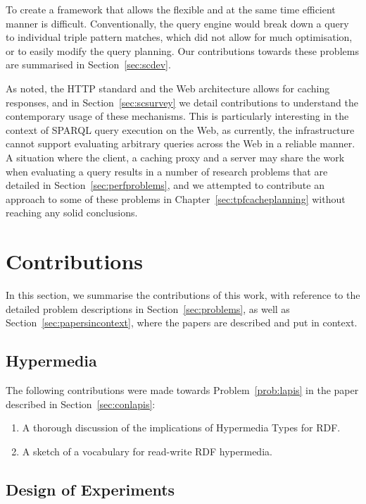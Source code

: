 To create a framework that allows the flexible and at the same time
efficient manner is difficult. Conventionally, the query engine would
break down a query to individual triple pattern matches, which did not
allow for much optimisation, or to easily modify the query
planning. Our contributions towards these problems are summarised in
Section~\ref{sec:scdev}.

As noted, the HTTP standard and the Web architecture allows for
caching responses, and in Section~\ref{sec:scsurvey} we detail
contributions to understand the contemporary usage of these
mechanisms. This is particularly interesting in the context of SPARQL
query execution on the Web, as currently, the infrastructure cannot
support evaluating arbitrary queries across the Web in a reliable
manner. A situation where the client, a caching proxy and a server may
share the work when evaluating a query results in a number of research
problems that are detailed in Section~\ref{sec:perfproblems}, and we
attempted to contribute an approach to some of these problems in
Chapter~\ref{sec:tpfcacheplanning} without reaching any solid
conclusions.



\section{Contributions}\label{sec:contribsum}

In this section, we summarise the contributions of this work, with
reference to the detailed problem descriptions in
Section~\ref{sec:problems}, as well as
Section~\ref{sec:papersincontext}, where the papers are described and
put in context. 

\subsection{Hypermedia}\label{sec:schm}

The following contributions were made towards Problem~\ref{prob:lapis}
in the paper described in Section~\ref{sec:conlapis}:

\begin{enumerate}
\item A thorough discussion of the implications of Hypermedia
  Types\cite{hypermediatypes} for RDF.
\item A sketch of a vocabulary for read-write RDF hypermedia.
\end{enumerate}

\subsection{Design of Experiments}\label{sec:scdoe}


